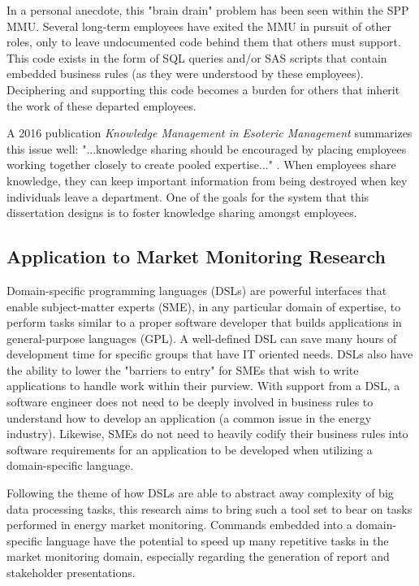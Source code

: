 In a personal anecdote, this "brain drain" problem has been seen within the SPP MMU. Several long-term employees have exited the MMU in pursuit of other roles, only to leave undocumented code behind them that others must support. This code exists in the form of SQL queries and/or SAS scripts that contain embedded business rules (as they were understood by these employees). Deciphering and supporting this code becomes a burden for others that inherit the work of these departed employees.

A 2016 publication \textit{Knowledge Management in Esoteric Management} summarizes this issue well: "...knowledge sharing should be encouraged by placing employees working together closely to create pooled expertise..." \cite{knowledge-management-in-esoteric-management}. When employees share knowledge, they can keep important information from being destroyed when key individuals leave a department. One of the goals for the system that this dissertation designs is to foster knowledge sharing amongst employees.

\subsection{Application to Market Monitoring Research}


Domain-specific programming languages (DSLs) are powerful interfaces that enable subject-matter experts (SME), in any particular domain of expertise, to perform tasks similar to a proper software developer that builds applications in general-purpose languages (GPL). A well-defined DSL can save many hours of development time for specific groups that have IT oriented needs. DSLs also have the ability to lower the "barriers to entry" for SMEs that wish to write applications to handle work within their purview. With support from a DSL, a software engineer does not need to be deeply involved in business rules to understand how to develop an application (a common issue in the energy industry). Likewise, SMEs do not need to heavily codify their business rules into software requirements for an application to be developed when utilizing a domain-specific language.

Following the theme of how DSLs are able to abstract away complexity of big data processing tasks, this research aims to bring such a tool set to bear on tasks performed in energy market monitoring. Commands embedded into a domain-specific language have the potential to speed up many repetitive tasks in the market monitoring domain, especially regarding the generation of report and stakeholder presentations.

